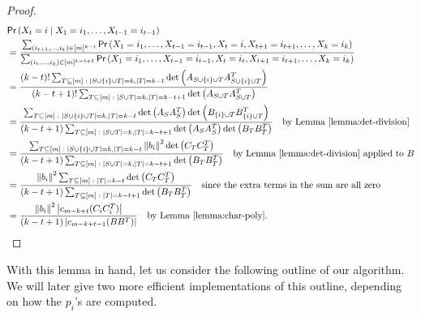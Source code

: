 \documentclass[11pt]{article}
\def\suchthat{\;:\;}
\def\given{\;|\;}
\newcommand{\deter}[1]{\operatorname{det}\left(#1\right)}
\newcommand{\norm}[1]{\left\|#1\right\|}
\newcommand{\prob}[1]{{\sf Pr} \left(#1\right)}
\newcommand{\abs}[1]{\left|#1\right|}
\newcommand{\size}[1]{\left|#1\right|}
\begin{document}
\begin{proof}
\begin{align*}
& \prob{X_{t} = i \given X_{1} = i_{1}, \dotsc, X_{t-1} = i_{t-1}} \\
& = \frac{\sum_{(i_{t+1}, \dotsc, i_{k}) \in [m]^{k-t}} \prob{X_{1} = i_{1}, \dotsc, X_{t-1} = i_{t-1}, X_{t} = i, X_{t+1} = i_{t+1}, \dotsc, X_{k} = i_{k}}}{\sum_{(i_{t}, \dotsc, i_{k}) \in [m]^{k-t+1}} \prob{X_{1} = i_{1}, \dotsc, X_{t-1} = i_{t-1}, X_{t} = i_{t}, X_{t+1} = i_{t+1}, \dotsc, X_{k} = i_{k}}} \\
& = \frac{(k-t)! \sum_{T \subseteq [m] \suchthat \size{S \cup \{i\} \cup T}=k, \size{T}=k-t} \deter{A_{S \cup \{i\} \cup T} A_{S \cup \{i\} \cup T}^{T}}}{(k-t+1)! \sum_{T \subseteq [m] \suchthat \size{S \cup T}=k, \size{T}=k-t+1} \deter{A_{S \cup T} A_{S \cup T}^{T}}} \\
& = \frac{\sum_{T \subseteq [m] \suchthat \size{S \cup\{i\} \cup T}=k, \size{T}=k-t} \deter{A_{S} A_{S}^{T}} \deter{B_{\{i\} \cup T} B_{\{i\} \cup T}^{T}}}{(k-t+1) \sum_{T \subseteq [m] \suchthat \size{S \cup T}=k, \size{T}=k-t+1} \deter{A_{S} A_{S}^{T}} \deter{B_{T} B_{T}^{T}}} \quad \text{by Lemma \ref{lemma:det-division}} \\
& = \frac{\sum_{T \subseteq [m] \suchthat \size{S \cup \{i\} \cup T}=k, \size{T}=k-t} \norm{b_{i}}^{2} \deter{C_{T} C_{T}^{T}}}{(k-t+1) \sum_{T \subseteq [m] \suchthat \size{S \cup T}=k, \size{T}=k-t+1} \deter{B_{T} B_{T}^{T}}} \quad \text{by Lemma \ref{lemma:det-division} applied to $B$} \\
& = \frac{\norm{b_{i}}^{2} \sum_{T \subseteq [m] \suchthat \size{T}=k-t} \deter{C_{T} C_{T}^{T}}}{(k-t+1) \sum_{T \subseteq [m] \suchthat \size{T}=k-t+1} \deter{B_{T} B_{T}^{T}}} \quad \text{since the extra terms in the sum are all zero} \\
& = \frac{\norm{b_{i}}^{2} \abs{c_{m-k+t}(C_{i} C_{i}^{T})}}{(k-t+1) \abs{c_{m-k+t-1}(BB^{T})}} \quad \text{by Lemma \ref{lemma:char-poly}}.
\end{align*}
\end{proof}


With this lemma in hand, let us consider the following outline of our algorithm. We will later give two more efficient implementations of this outline, depending on how the $p_{i}$'s are computed.
\end{document}
